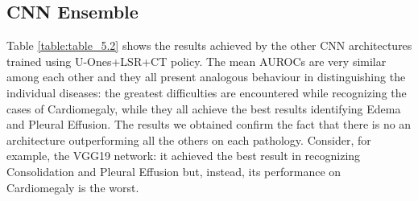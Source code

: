 \begin{table}[h!]
\centering
{}
\caption[AUROC comparison for different training policies on DenseNet121]{AUROC values obtained using DenseNet121 as architecture and the approaches indicated in the \textbf{Method} column. For each label, the highest AUROC is boldfaced.}
\label{table:table_5.1}
\end{table}



\subsection{CNN Ensemble}

 Table \ref{table:table_5.2} shows the results achieved by the other \ac{CNN} architectures trained using U-Ones+LSR+CT policy. The mean \acp{AUROC} are very similar among each other and they all present analogous behaviour in distinguishing the individual diseases: the greatest difficulties are encountered while recognizing the cases of Cardiomegaly, while they all achieve the best results identifying Edema and Pleural Effusion. The results we obtained confirm the fact that there is no an architecture outperforming all the others on each pathology. Consider, for example, the VGG19 network: it achieved the best result in recognizing Consolidation and Pleural Effusion but, instead, its performance on Cardiomegaly is the worst. 

